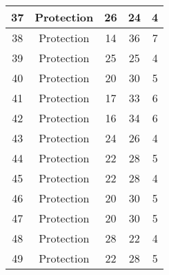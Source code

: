 \documentclass[results.tex]{subfiles}
\begin{document}
\begin{center}
\begin{tabular}{| c || c | c | c | c |}
            \hline
            37                      & Protection                   & 26                     & 24                      & 4                    \\
            \hline
            38                      & Protection                   & 14                     & 36                      & 7                    \\
            \hline
            39                      & Protection                   & 25                     & 25                      & 4                    \\
            \hline
            40                      & Protection                   & 20                     & 30                      & 5                    \\
            \hline
            41                      & Protection                   & 17                     & 33                      & 6                    \\
            \hline
            42                      & Protection                   & 16                     & 34                      & 6                    \\
            \hline
            43                      & Protection                   & 24                     & 26                      & 4                    \\
            \hline
            44                      & Protection                   & 22                     & 28                      & 5                    \\
            \hline
            45                      & Protection                   & 22                     & 28                      & 4                    \\
            \hline
            46                      & Protection                   & 20                     & 30                      & 5                    \\
            \hline
            47                      & Protection                   & 20                     & 30                      & 5                    \\
            \hline
            48                      & Protection                   & 28                     & 22                      & 4                    \\
            \hline
            49                      & Protection                   & 22                     & 28                      & 5                    \\
            \hline
        \end{tabular}
    \end{center}
\end{document}
